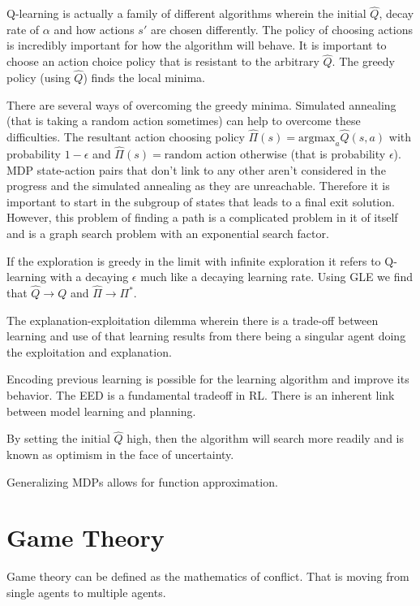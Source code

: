 \documentclass{article}
\begin{document}
Q-learning is actually a family of different algorithms wherein the initial
$\hat{Q}$, decay rate of $\alpha$ and how actions $s'$ are chosen differently.
The policy of choosing actions is incredibly important for how the algorithm 
will behave. It is important to choose an action choice policy that is resistant
to the arbitrary $\hat{Q}$. The greedy policy (using $\hat{Q}$) finds the local
minima. 

There are several ways of overcoming the greedy minima. Simulated annealing
(that is taking a random action sometimes) can help to overcome these
difficulties. The resultant action choosing policy $\hat{\Pi}(s) = \text{argmax}
_a\hat{Q}(s,a)$ with probability $1 - \epsilon$ and $\hat{\Pi}(s) = \text{random
action}$ otherwise (that is probability $\epsilon$). MDP state-action pairs that 
don't link to any other aren't considered in the progress and the simulated 
annealing as they are unreachable. Therefore it is important to start in
the subgroup of states that leads to a final exit solution. However, this 
problem of finding a path is a complicated problem in it of itself and is a 
graph search problem with an exponential search factor.

If the exploration is greedy in the limit with infinite exploration it refers to
Q-learning with a decaying $\epsilon$ much like a decaying learning rate. Using 
GLE we find that $\hat{Q} \rightarrow Q$ and $\hat{\Pi} \rightarrow \Pi^*$. 

The explanation-exploitation dilemma wherein there is a trade-off between 
learning and use of that learning results from there being a singular agent
doing the exploitation and explanation. 

Encoding previous learning is possible for the learning algorithm and improve
its behavior. The EED is a fundamental tradeoff in RL. There is an inherent link
between model learning and planning. 

By setting the initial $\hat{Q}$ high, then the algorithm will search more
readily and is known as optimism in the face of uncertainty. 

Generalizing MDPs allows for function approximation.

\section{Game Theory}

Game theory can be defined as the mathematics of conflict. That is moving from 
single agents to multiple agents. 
\end{document}
